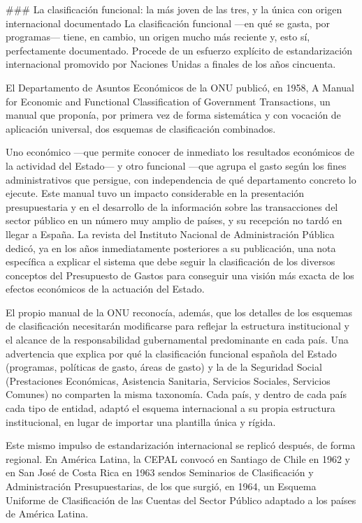 \documentclass[10pt,a4paper]{article}
\begin{document}
### La clasificación funcional: la más joven de las tres, y la única con origen internacional documentado
La clasificación funcional —en qué se gasta, por programas— tiene, en cambio, un origen mucho más reciente y, esto sí, perfectamente documentado. Procede de un esfuerzo explícito de estandarización internacional promovido por Naciones Unidas a finales de los años cincuenta. 

El Departamento de Asuntos Económicos de la ONU publicó, en 1958, A Manual for Economic and Functional Classification of Government Transactions, un manual que proponía, por primera vez de forma sistemática y con vocación de aplicación universal, dos esquemas de clasificación combinados.

Uno económico —que permite conocer de inmediato los resultados económicos de la actividad del Estado— y otro funcional —que agrupa el gasto según los fines administrativos que persigue, con independencia de qué departamento concreto lo ejecute. Este manual tuvo un impacto considerable en la presentación presupuestaria y en el desarrollo de la información sobre las transacciones del sector público en un número muy amplio de países, y su recepción no tardó en llegar a España. La revista del Instituto Nacional de Administración Pública dedicó, ya en los años inmediatamente posteriores a su publicación, una nota específica a explicar el sistema que debe seguir la clasificación de los diversos conceptos del Presupuesto de Gastos para conseguir una visión más exacta de los efectos económicos de la actuación del Estado. 

El propio manual de la ONU reconocía, además, que los detalles de los esquemas de clasificación necesitarán modificarse para reflejar la estructura institucional y el alcance de la responsabilidad gubernamental predominante en cada país. Una advertencia que explica por qué la clasificación funcional española del Estado (programas, políticas de gasto, áreas de gasto) y la de la Seguridad Social (Prestaciones Económicas, Asistencia Sanitaria, Servicios Sociales, Servicios Comunes) no comparten la misma taxonomía. Cada país, y dentro de cada país cada tipo de entidad, adaptó el esquema internacional a su propia estructura institucional, en lugar de importar una plantilla única y rígida. 

Este mismo impulso de estandarización internacional se replicó después, de forma regional. En América Latina, la CEPAL convocó en Santiago de Chile en 1962 y en San José de Costa Rica en 1963 sendos Seminarios de Clasificación y Administración Presupuestarias, de los que surgió, en 1964, un Esquema Uniforme de Clasificación de las Cuentas del Sector Público adaptado a los países de América Latina.
\end{document}
